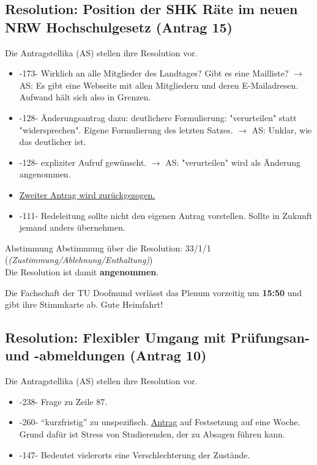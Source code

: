   \subsection{Resolution: Position der SHK Räte im neuen NRW Hochschulgesetz (Antrag 15)}
    Die Antragstellika (AS) stellen ihre Resolution vor.
    \begin{itemize}
      \item -173- Wirklich an alle Mitglieder des Landtages? Gibt es eine Mailliste?
        $\rightarrow$ AS: Es gibt eine Webseite mit allen Mitgliedern und deren E-Mailadresen. Aufwand hält sich also in Grenzen.

      \item -128- Änderungsantrag dazu: deutlichere Formulierung: "verurteilen" statt "widersprechen". Eigene Formulierung des letzten Satzes.
        $\rightarrow$ AS: Unklar, wie das deutlicher ist.
      \item -128- expliziter Aufruf gewünscht.
        $\rightarrow$ AS: "verurteilen" wird als Änderung angenommen.
      \item \underline{Zweiter Antrag wird zurückgezogen.}
      \item -111- Redeleitung sollte nicht den eigenen Antrag vorstellen. Sollte in Zukunft jemand anders übernehmen.
    \end{itemize}

    \begin{success}{Abstimmung}
      Abstimmung über die Resolution: 33/1/1 (\textit{(Zustimmung/Ablehnung/Enthaltung)}) \\
      Die Resolution ist damit \textbf{angenommen}.
    \end{success}

    \begin{info}{}
      Die Fachschaft der TU Doofmund verlässt das Plenum vorzeitig um \textbf{15:50} und gibt ihre Stimmkarte ab. Gute Heimfahrt!
    \end{info}

  \subsection{Resolution: Flexibler Umgang mit Prüfungsan- und -abmeldungen (Antrag 10)}
    Die Antragstellika (AS) stellen ihre Resolution vor.
    \begin{itemize}
      \item -238- Frage zu Zeile 87.
      \item -260- ``kurzfristig'' zu unspezifisch. \underline{Antrag} auf Festsetzung auf eine Woche. Grund dafür ist Stress von Studierenden, der zu Absagen führen kann.
      \item -147- Bedeutet vielerorts eine Verschlechterung der Zustände.
    \end{itemize}

